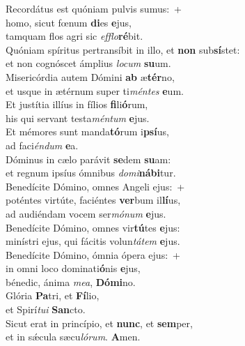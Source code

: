 \evenverse Recordátus est quóniam pulvis sumus:~+\\\evenverse  homo, sicut fœnum \textbf{di}es \textbf{e}jus,~\*\\
\evenverse tamquam flos agri sic \textit{ef}\textit{flo}\textbf{ré}bit.\\
\oddverse Quóniam spíritus pertransíbit in illo, et \textbf{non} sub\textbf{sí}stet:~\*\\
\oddverse et non cognóscet ámplius \textit{lo}\textit{cum} \textbf{su}um.\\
\evenverse Misericórdia autem Dómini \textbf{ab} æ\textbf{tér}no,~\*\\
\evenverse et usque in ætérnum super ti\textit{mén}\textit{tes} \textbf{e}um.\\
\oddverse Et justítia illíus in fílios \textbf{fi}li\textbf{ó}rum,~\*\\
\oddverse his qui servant testa\textit{mén}\textit{tum} \textbf{e}jus.\\
\evenverse Et mémores sunt manda\textbf{tó}rum i\textbf{psí}us,~\*\\
\evenverse ad faci\textit{én}\textit{dum} \textbf{e}a.\\
\oddverse Dóminus in cælo parávit \textbf{se}dem \textbf{su}am:~\*\\
\oddverse et regnum ipsíus ómnibus \textit{do}\textit{mi}\textbf{ná}\textbf{bi}tur.\\
\evenverse Benedícite Dómino, omnes Angeli ejus:~+\\
\evenverse  poténtes virtúte, faciéntes \textbf{ver}bum il\textbf{lí}us,~\*\\
\evenverse ad audiéndam vocem ser\textit{mó}\textit{num} \textbf{e}jus.\\
\oddverse Benedícite Dómino, omnes vir\textbf{tú}tes \textbf{e}jus:~\*\\
\oddverse minístri ejus, qui fácitis volun\textit{tá}\textit{tem} \textbf{e}jus.\\
\evenverse Benedícite Dómino, ómnia ópera ejus:~+\\
\evenverse  in omni loco dominati\textbf{ó}nis \textbf{e}jus,~\*\\
\evenverse bénedic, ánima \textit{me}\textit{a}, \textbf{Dó}\textbf{mi}no.\\
\oddverse Glória \textbf{Pa}tri, et \textbf{Fí}lio,~\*\\
\oddverse et Spirí\textit{tu}\textit{i} \textbf{San}cto.\\
\evenverse Sicut erat in princípio, et \textbf{nunc}, et \textbf{sem}per,~\*\\
\evenverse et in sǽcula sæcu\textit{ló}\textit{rum}. \textbf{A}men.\\
